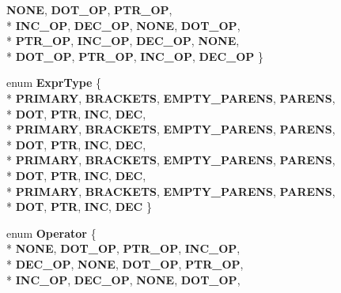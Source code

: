 \begin{DoxyCompactItemize}
{\bfseries N\-O\-N\-E}, 
{\bfseries D\-O\-T\-\_\-\-O\-P}, 
{\bfseries P\-T\-R\-\_\-\-O\-P}, 
\\*
{\bfseries I\-N\-C\-\_\-\-O\-P}, 
{\bfseries D\-E\-C\-\_\-\-O\-P}, 
{\bfseries N\-O\-N\-E}, 
{\bfseries D\-O\-T\-\_\-\-O\-P}, 
\\*
{\bfseries P\-T\-R\-\_\-\-O\-P}, 
{\bfseries I\-N\-C\-\_\-\-O\-P}, 
{\bfseries D\-E\-C\-\_\-\-O\-P}, 
{\bfseries N\-O\-N\-E}, 
\\*
{\bfseries D\-O\-T\-\_\-\-O\-P}, 
{\bfseries P\-T\-R\-\_\-\-O\-P}, 
{\bfseries I\-N\-C\-\_\-\-O\-P}, 
{\bfseries D\-E\-C\-\_\-\-O\-P}
 \}
\item 
enum {\bfseries Expr\-Type} \{ \\*
{\bfseries P\-R\-I\-M\-A\-R\-Y}, 
{\bfseries B\-R\-A\-C\-K\-E\-T\-S}, 
{\bfseries E\-M\-P\-T\-Y\-\_\-\-P\-A\-R\-E\-N\-S}, 
{\bfseries P\-A\-R\-E\-N\-S}, 
\\*
{\bfseries D\-O\-T}, 
{\bfseries P\-T\-R}, 
{\bfseries I\-N\-C}, 
{\bfseries D\-E\-C}, 
\\*
{\bfseries P\-R\-I\-M\-A\-R\-Y}, 
{\bfseries B\-R\-A\-C\-K\-E\-T\-S}, 
{\bfseries E\-M\-P\-T\-Y\-\_\-\-P\-A\-R\-E\-N\-S}, 
{\bfseries P\-A\-R\-E\-N\-S}, 
\\*
{\bfseries D\-O\-T}, 
{\bfseries P\-T\-R}, 
{\bfseries I\-N\-C}, 
{\bfseries D\-E\-C}, 
\\*
{\bfseries P\-R\-I\-M\-A\-R\-Y}, 
{\bfseries B\-R\-A\-C\-K\-E\-T\-S}, 
{\bfseries E\-M\-P\-T\-Y\-\_\-\-P\-A\-R\-E\-N\-S}, 
{\bfseries P\-A\-R\-E\-N\-S}, 
\\*
{\bfseries D\-O\-T}, 
{\bfseries P\-T\-R}, 
{\bfseries I\-N\-C}, 
{\bfseries D\-E\-C}, 
\\*
{\bfseries P\-R\-I\-M\-A\-R\-Y}, 
{\bfseries B\-R\-A\-C\-K\-E\-T\-S}, 
{\bfseries E\-M\-P\-T\-Y\-\_\-\-P\-A\-R\-E\-N\-S}, 
{\bfseries P\-A\-R\-E\-N\-S}, 
\\*
{\bfseries D\-O\-T}, 
{\bfseries P\-T\-R}, 
{\bfseries I\-N\-C}, 
{\bfseries D\-E\-C}
 \}
\item 
enum {\bfseries Operator} \{ \\*
{\bfseries N\-O\-N\-E}, 
{\bfseries D\-O\-T\-\_\-\-O\-P}, 
{\bfseries P\-T\-R\-\_\-\-O\-P}, 
{\bfseries I\-N\-C\-\_\-\-O\-P}, 
\\*
{\bfseries D\-E\-C\-\_\-\-O\-P}, 
{\bfseries N\-O\-N\-E}, 
{\bfseries D\-O\-T\-\_\-\-O\-P}, 
{\bfseries P\-T\-R\-\_\-\-O\-P}, 
\\*
{\bfseries I\-N\-C\-\_\-\-O\-P}, 
{\bfseries D\-E\-C\-\_\-\-O\-P}, 
{\bfseries N\-O\-N\-E}, 
{\bfseries D\-O\-T\-\_\-\-O\-P}, 

\end{DoxyCompactItemize}
